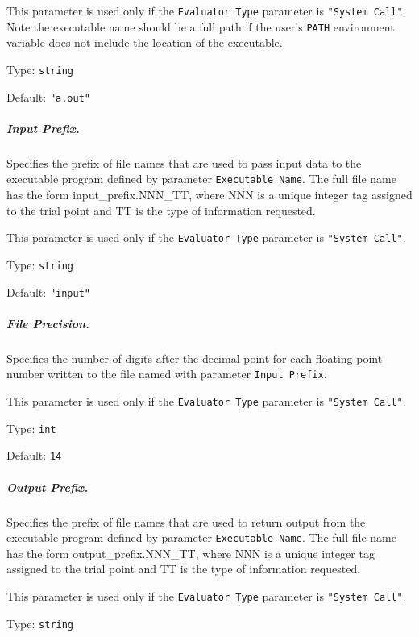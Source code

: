 \noindent
This parameter is used only if the {\tt Evaluator Type} parameter is
{\tt"System Call"}.  Note the executable name should be a full path
if the user's {\tt PATH} environment variable does not include the
location of the executable.

\hspace{0.2in}
Type: {\tt string}

\hspace{0.2in}
Default: {\tt "a.out"}

\subparagraph{Input Prefix.}  \label{param:EV-inprefix}
Specifies the prefix of file names that are used to pass input data to the
executable program defined by parameter {\tt Executable Name}.
The full file name has the
form {\sf input\_prefix.NNN\_TT}, where {\sf NNN} is a unique integer
tag assigned to the trial point and {\sf TT} is the type of information
requested.

\noindent
This parameter is used only if the {\tt Evaluator Type} parameter is
{\tt"System Call"}.

\hspace{0.2in}
Type: {\tt string}

\hspace{0.2in}
Default: {\tt "input"}

\subparagraph{File Precision.}  \label{param:EV-prec}
Specifies the number of digits after the decimal point
for each floating point number written to the file named with parameter
{\tt Input Prefix}.

\noindent
This parameter is used only if the {\tt Evaluator Type} parameter is
{\tt"System Call"}.

\hspace{0.2in}
Type: {\tt int}

\hspace{0.2in}
Default: {\tt 14}

\subparagraph{Output Prefix.}  \label{param:EV-outprefix}
Specifies the prefix of file names that are used to return output from the
executable program defined by parameter {\tt Executable Name}.
The full file name has
the form {\sf output\_prefix.NNN\_TT}, where {\sf NNN} is a unique
integer tag assigned to the trial point and {\sf TT} is the type of information
requested.

\noindent
This parameter is used only if the {\tt Evaluator Type} parameter is
{\tt"System Call"}.

\hspace{0.2in}
Type: {\tt string}

